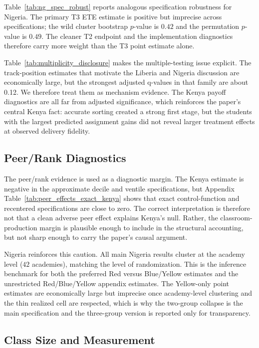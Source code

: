 \documentclass[11pt]{article}
\begin{document}
Table~\ref{tab:ng_spec_robust} reports analogous specification robustness for Nigeria. The primary T3 ETE estimate is positive but imprecise across specifications; the wild cluster bootstrap $p$-value is $0.42$ and the permutation $p$-value is $0.49$. The cleaner T2 endpoint and the implementation diagnostics therefore carry more weight than the T3 point estimate alone.

Table~\ref{tab:multiplicity_disclosure} makes the multiple-testing issue explicit. The track-position estimates that motivate the Liberia and Nigeria discussion are economically large, but the strongest adjusted q-values in that family are about 0.12. We therefore treat them as mechanism evidence. The Kenya payoff diagnostics are all far from adjusted significance, which reinforces the paper's central Kenya fact: accurate sorting created a strong first stage, but the students with the largest predicted assignment gains did not reveal larger treatment effects at observed delivery fidelity.

\subsection{Peer/Rank Diagnostics}

The peer/rank evidence is used as a diagnostic margin. The Kenya estimate is negative in the approximate decile and ventile specifications, but Appendix Table~\ref{tab:peer_effects_exact_kenya} shows that exact control-function and recentered specifications are close to zero. The correct interpretation is therefore not that a clean adverse peer effect explains Kenya's null. Rather, the classroom-production margin is plausible enough to include in the structural accounting, but not sharp enough to carry the paper's causal argument.

Nigeria reinforces this caution. All main Nigeria results cluster at the academy level ($42$ academies), matching the level of randomization. This is the inference benchmark for both the preferred Red versus Blue/Yellow estimates and the unrestricted Red/Blue/Yellow appendix estimates. The Yellow-only point estimates are economically large but imprecise once academy-level clustering and the thin realized cell are respected, which is why the two-group collapse is the main specification and the three-group version is reported only for transparency.

\subsection{Class Size and Measurement}
\end{document}
